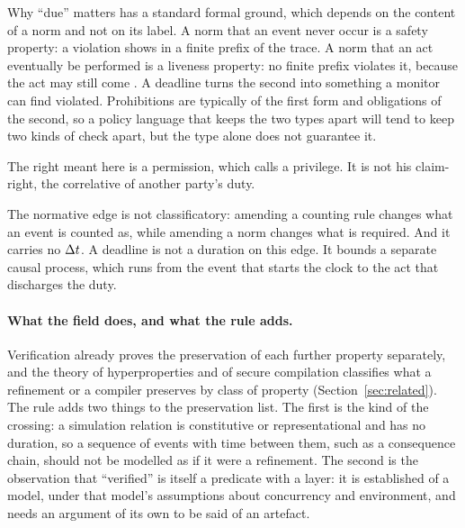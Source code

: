 Why ``due'' matters has a standard formal ground, which depends on the content of a norm
and not on its label. A norm that an event never occur is a safety property: a violation
shows in a finite prefix of the trace. A norm that an act eventually be performed is a
liveness property: no finite prefix violates it, because the act may still come
\citep{alpern1985}. A deadline turns the second into something a monitor can find
violated. Prohibitions are typically of the first form and obligations of the second,
so a policy language that keeps the two types apart will tend to keep two kinds of check
apart, but the type alone does not guarantee it.

The right meant here is a permission, which \citet{hohfeld1913} calls a privilege. It is
not his claim-right, the correlative of another party's duty.

The normative edge is not classificatory: amending a counting rule changes what an event
is counted as, while amending a norm changes what is required. And it carries no $\Delta t$. A
deadline is not a duration on this edge. It bounds a separate causal process, which runs
from the event that starts the clock to the act that discharges the duty.

\paragraph{What the field does, and what the rule adds.} Verification already proves the
preservation of each further property separately, and the theory of hyperproperties and
of secure compilation classifies what a refinement or a compiler preserves by class of
property (Section~\ref{sec:related}). The rule adds two things to the preservation list.
The first is the kind of the crossing: a simulation relation is constitutive or
representational and has no duration, so a sequence of events with time between them,
such as a consequence chain, should not be modelled as if it were a refinement. The
second is the observation that ``verified'' is itself a predicate with a layer: it is
established of a model, under that model's assumptions about concurrency and
environment, and needs an argument of its own to be said of an artefact.
